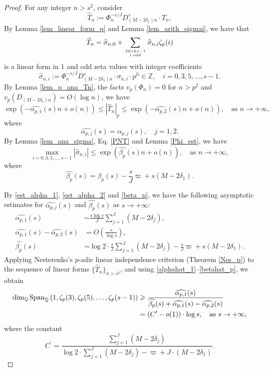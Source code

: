 \documentclass[12pt]{article}
\numberwithin{equation}{section}
\begin{document}
\bigskip

\begin{proof}
For any integer $n>s^2$, consider  
\[ \widehat{T}_n := \Phi_n^{-s/J} D_{(M-2\delta_1)n}^{s} \cdot T_n, \]
By Lemma \ref{lem_linear_form_p} and Lemma \ref{lem_arith_sigmai}, we have that
\[ \widehat{T}_n = \widehat{\sigma}_{n,0} + \sum_{3 \leqslant i \leqslant s-1 \atop i \text{~odd}} \widehat{\sigma}_{n,i}\zeta_p(i)  \]
is a linear form in $1$ and odd zeta values with integer coefficients
\[ \widehat{\sigma}_{n,i} := \Phi_n^{-s/J} D_{(M-2\delta_1)n}^{s} \cdot \sigma_{n,i} \cdot p^{li} \in \mathbb{Z}, \quad i=0,3,5,\ldots,s-1. \]
By Lemma \ref{lem_p_ana_Tn}, the facts $v_p(\Phi_n)=0$ for $n>p^2$ and $v_p(D_{(M-2\delta_1)n})=O(\log n)$, we have
\[  \exp\left( -\widehat{\alpha_{p,1}}(s)n+o(n) \right) \leqslant |\widehat{T}_n|_p \leqslant \exp\left( -\widehat{\alpha_{p,2}}(s)n+o(n) \right),  \quad \text{as~} n\to +\infty, \]
where
\[ \widehat{\alpha_{p,j}}(s) = \alpha_{p,j}(s), \quad j=1,2. \]
By Lemma \ref{lem_ana_sigma}, Eq. \eqref{PNT} and Lemma \ref{Phi_est}, we have
\[ \max_{i=0,3,5,\ldots,s-1} |\widehat{\sigma}_{n,i}| \leqslant \exp\left( \widehat{\beta_p}(s)n + o(n) \right), \quad \text{as~} n\to +\infty, \]
where
\[ \widehat{\beta_p}(s) = \beta_p(s) - \frac{s}{J}\varpi + s(M-2\delta_1). \]
	
By \eqref{est_alpha_1}, \eqref{est_alpha_2} and \eqref{beta_p}, we have the following asymptotic estimates for $\widehat{\alpha_{p,j}}(s)$ and $\widehat{\beta_p}(s)$ as $s \to +\infty$:
\begin{align}
\widehat{\alpha_{p,1}}(s) &\sim  \frac{s\log s}{J}\sum_{j=1}^{J}(M-2\delta_j),   \label{alphahat_1}\\
\widehat{\alpha_{p,1}}(s) - \widehat{\alpha_{p,2}}(s) &= O\left( \frac{s}{\log s} \right), \label{alphahat_2}\\
\widehat{\beta_p}(s) &\sim  \log 2 \cdot \frac{s}{J}\sum_{j=1}^{J}(M-2\delta_j) - \frac{s}{J}\varpi + s(M-2\delta_1). \label{betahat_p}
\end{align}
Applying Nesterenko's $p$-adic linear independence criterion (Theorem \ref{Nes_p}) to the sequence of linear forms $\{ \widehat{T}_n \}_{n > s^2}$, and using \eqref{alphahat_1}--\eqref{betahat_p}, we obtain
\begin{align}
\dim_{\mathbb{Q}}\operatorname{Span}_{\mathbb{Q}}\left( 1,\zeta_p(3),\zeta_p(5),\ldots,\zeta_p(s-1) \right) &\geqslant \frac{\widehat{\alpha_{p,1}}(s)}{\widehat{\beta_p}(s) + \widehat{\alpha_{p,1}}(s) - \widehat{\alpha_{p,2}}(s) } \notag \\
&= (C^{\prime}-o(1)) \cdot \log s, \quad \text{as~} s \to +\infty, \label{dim>C^primelogs}
\end{align}
where the constant
\begin{equation*}
C^{\prime} = \frac{\sum_{j=1}^{J} (M-2\delta_j) }{\log2 \cdot \sum_{j=1}^{J}(M-2\delta_j)  - \varpi  + J\cdot(M-2\delta_1)}. 
\end{equation*}
	

\end{proof}
\end{document}
